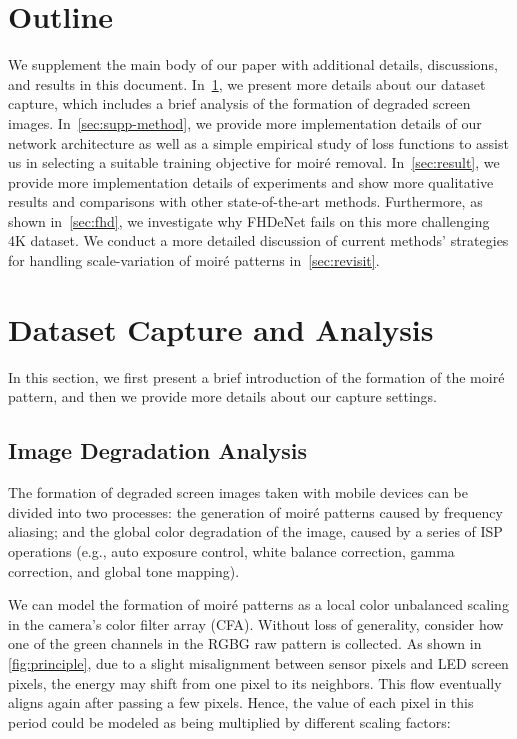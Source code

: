 \documentclass[runningheads]{llncs}
\newcommand{\eg}{e.g.}
\begin{document}
\section*{Outline}
We supplement the main body of our paper with additional details, discussions, and results in this document.
In~\cref{sec:supp-dataset}, we present more details about our dataset capture, which includes a brief analysis of the formation of degraded screen images.
In~\cref{sec:supp-method}, we provide more implementation details of our network architecture as well as a simple empirical study of loss functions to assist us in selecting a suitable training objective for moiré removal.
In~\cref{sec:result}, we provide more implementation details of experiments and show more qualitative results and comparisons with other state-of-the-art methods.
Furthermore, as shown in~\cref{sec:fhd}, we investigate why FHDeNet fails on this more challenging 4K dataset.  
We conduct a more detailed discussion of current methods' strategies for handling scale-variation of moiré patterns in~\cref{sec:revisit}. 



\section{Dataset Capture and Analysis}\label{sec:supp-dataset}
In this section, we first present a brief introduction of the formation of the moiré pattern, and then we provide more details about our capture settings.

\subsection{Image Degradation Analysis}
The formation of degraded screen images taken with mobile devices can be divided into two processes: the generation of moiré patterns caused by frequency aliasing; and the global color degradation of the image, caused by a series of ISP operations (\eg, auto exposure control, white balance correction, gamma correction, and global tone mapping).

We can model the formation of moiré patterns as a local color unbalanced scaling in the camera's color filter array (CFA). 
Without loss of generality, consider how one of the green channels in the RGBG raw pattern is collected. 
As shown in \cref{fig:principle}, due to a slight misalignment between sensor pixels and LED screen pixels, the energy may shift from one pixel to its neighbors. This flow eventually aligns again after passing a few pixels. Hence, the value of each pixel in this period could be modeled as being multiplied by different scaling factors:
\end{document}
